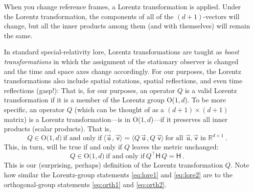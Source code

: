 \documentclass{article}
\newcommand{\metric}{\mathsf{H}}
\newcommand\upvec[1]{\!\vec{\,\mathrm{#1}}}
\newcommand{\Lvec}[1]{\upvec{\mathsf{#1}}} %
\newcommand{\inner}[2]{\langle{#1}\,,{#2}\rangle}
\newcommand{\plus}{\!+\!} %
\begin{document}
When you change reference frames, a Lorentz transformation is applied.
Under the Lorentz transformation, the components of all of the $(d\plus1)$-vectors will change, but all the inner products among them (and with themselves) will remain the same.

In standard special-relativity lore, Lorentz transformations are taught as \emph{boost transformations} in which the assignment of the stationary observer is changed and the time and space axes change accordingly.
For our purposes, the Lorentz transformations also include spatial rotations, spatial reflections, and even time reflections (gasp!):
That is, for our purposes, an operator $Q$ is a valid Lorentz transformation if it is a member of the Lorentz group O($1,d$).
To be more specific, an operator $Q$ (which can be thought of as a $(d+1)\times(d+1)$ matrix) is a Lorentz transformation---is in O($1,d$)---if it preserves all inner products (scalar products). 
That is,
\begin{equation}
    Q \in \mbox{O($1,d$)} ~ \mbox{if and only if} ~ \inner{\Lvec{u}}{\Lvec{v}}=\inner{Q\,\Lvec{u}}{Q\,\Lvec{v}} ~ \mbox{for all $\Lvec{u},\Lvec{v}$ in $\mathbb{R}^{d+1}$} ~.\label{eq:lore1}
\end{equation}
This, in turn, will be true if and only if $Q$ leaves the metric unchanged:
\begin{equation}
    Q \in \mbox{O($1,d$)} ~ \mbox{if and only if} ~ Q^\top\metric\,Q=\metric ~.\label{eq:lore2}
\end{equation}
This is our (surprising, perhaps) definition of the Lorentz transformation $Q$.
Note how similar the Lorentz-group statements \eqref{eq:lore1} and \eqref{eq:lore2} are to the orthogonal-group statements \eqref{eq:orth1} and \eqref{eq:orth2}.
\end{document}
